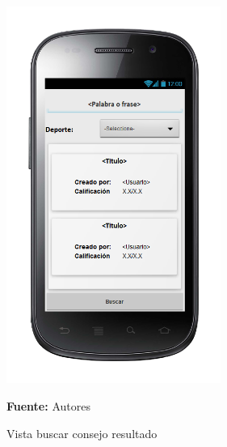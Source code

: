 \begin{figure}[!htb]
  \begin{center}
\includegraphics[width=7cm]{./imagenes/UI/Contenidos/buscar_consejo_resultado.png}
    \caption{Vista buscar consejo resultado}
    \label{fig:Vista_buscar_consejo_resultado}
    \textbf{Fuente:}  Autores
  \end{center}
\end{figure}
